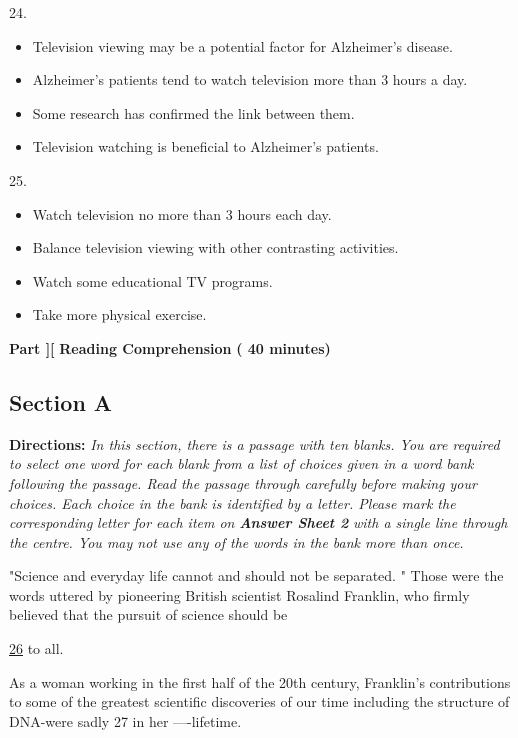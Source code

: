 \documentclass[UTF8,11pt]{ctexart}
\begin{document}
24.


\begin{itemize}[leftmargin=2em,itemsep=.2em,topsep=.4em]\item[A.] Television viewing may be a potential factor for Alzheimer's disease.
\item[B.] Alzheimer's patients tend to watch television more than 3 hours a day.
\item[C.] Some research has confirmed the link between them.
\item[D.] Television watching is beneficial to Alzheimer's patients.
\end{itemize}

25.


\begin{itemize}[leftmargin=2em,itemsep=.2em,topsep=.4em]\item[A.] Watch television no more than 3 hours each day.
\item[B.] Balance television viewing with other contrasting activities.
\item[C.] Watch some educational TV programs.
\item[D.] Take more physical exercise.
\end{itemize}

\textbf{Part ][} \textbf{Reading Comprehension} \textbf{( 40 minutes)}


\subsection*{\textbf{Section A}}


\textbf{Directions: }\textit{In this section, there is a passage with ten blanks. You are required to select one word for each} \textit{blank from a list of choices given in a word bank following the passage. Read the passage through carefully} \textit{before making your choices. Each choice in the bank is identified by a letter. Please mark the corresponding} \textit{letter for each item on }\textbf{\textit{Answer Sheet 2 }}\textit{with a single line through the centre. You may not use any of the} \textit{words in the bank more than once.}


"Science and everyday life cannot and should not be separated. " Those were the words uttered by pioneering British scientist Rosalind Franklin, who firmly believed that the pursuit of science should be


\uline{26} to all.


As a woman working in the first half of the 20th century, Franklin's contributions to some of the greatest scientific discoveries of our time including the structure of DNA-were sadly 27 in her ----lifetime.
\end{document}
